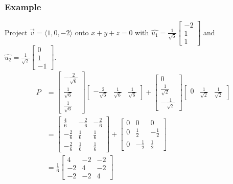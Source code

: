 \documentclass{math}
\begin{document}
\subsubsection*{Example}
Project \( \vec{v} = \langle1,0,-2\rangle \) onto \( x+y+z = 0 \) with
\( \hat{u_1} = \frac{1}{\sqrt{6}}\begin{bmatrix}-2 \\ 1 \\ 1\end{bmatrix} \)
and
\( \hat{u_2} = \frac{1}{\sqrt{2}}\begin{bmatrix}0 \\ 1 \\ -1\end{bmatrix} \).
\begin{align*}
  P &= \begin{bmatrix}
    -\frac{2}{\sqrt{6}} \\ \frac{1}{\sqrt{6}} \\ \frac{1}{\sqrt{6}}
  \end{bmatrix}\begin{bmatrix}
    -\frac{2}{\sqrt{6}} & \frac{1}{\sqrt{6}} & \frac{1}{\sqrt{6}}
  \end{bmatrix}+\begin{bmatrix}
    0 \\ \frac{1}{\sqrt{2}} \\ -\frac{1}{\sqrt{2}}
  \end{bmatrix}\begin{bmatrix}
    0 & \frac{1}{\sqrt{2}} & \frac{1}{\sqrt{2}}
  \end{bmatrix} \\
  &= \begin{bmatrix}
    \frac{4}{6} & -\frac{2}{6} & -\frac{2}{6} \\
    -\frac{2}{6} & \frac{1}{6} & \frac{1}{6} \\
    -\frac{2}{6} & \frac{1}{6} & \frac{1}{6}
  \end{bmatrix}+\begin{bmatrix}
    0 & 0 & 0 \\
    0 & \frac{1}{2} & -\frac{1}{2} \\
    0 & -\frac{1}{2} & \frac{1}{2}
  \end{bmatrix} \\
  &= \frac{1}{6}\begin{bmatrix}
    4 & -2 & -2 \\
    -2 & 4 & -2 \\
    -2 & -2 & 4
  \end{bmatrix} \\

\end{align*}
\end{document}
